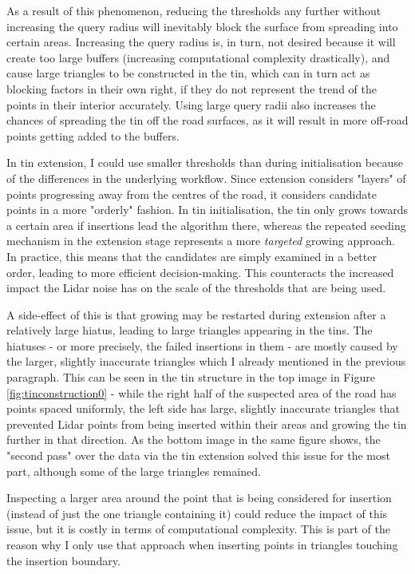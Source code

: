 As a result of this phenomenon, reducing the thresholds any further without increasing the query radius will inevitably block the surface from spreading into certain areas. Increasing the query radius is, in turn, not desired because it will create too large buffers (increasing computational complexity drastically), and cause large triangles to be constructed in the \ac{tin}, which can in turn act as blocking factors in their own right, if they do not represent the trend of the points in their interior accurately. Using large query radii also increases the chances of spreading the \ac{tin} off the road surfaces, as it will result in more off-road points getting added to the buffers.

In \ac{tin} extension, I could use smaller thresholds than during initialisation because of the differences in the underlying workflow. Since extension considers "layers" of points progressing away from the centres of the road, it considers candidate points in a more "orderly" fashion. In \ac{tin} initialisation, the \ac{tin} only grows towards a certain area if insertions lead the algorithm there, whereas the repeated seeding mechanism in the extension stage represents a more \textit{targeted} growing approach. In practice, this means that the candidates are simply examined in a better order, leading to more efficient decision-making. This counteracts the increased impact the Lidar noise has on the scale of the thresholds that are being used.

A side-effect of this is that growing may be restarted during extension after a relatively large hiatus, leading to large triangles appearing in the \ac{tin}s. The hiatuses - or more precisely, the failed insertions in them - are mostly caused by the larger, slightly inaccurate triangles which I already mentioned in the previous paragraph. This can be seen in the \ac{tin} structure in the top image in Figure \ref{fig:tinconstruction0} - while the right half of the suspected area of the road has points spaced uniformly, the left side has large, slightly inaccurate triangles that prevented Lidar points from being inserted within their areas and growing the \ac{tin} further in that direction. As the bottom image in the same figure shows, the "second pass" over the data via the \ac{tin} extension solved this issue for the most part, although some of the large triangles remained.

Inspecting a larger area around the point that is being considered for insertion (instead of just the one triangle containing it) could reduce the impact of this issue, but it is costly in terms of computational complexity. This is part of the reason why I only use that approach when inserting points in triangles touching the insertion boundary.

